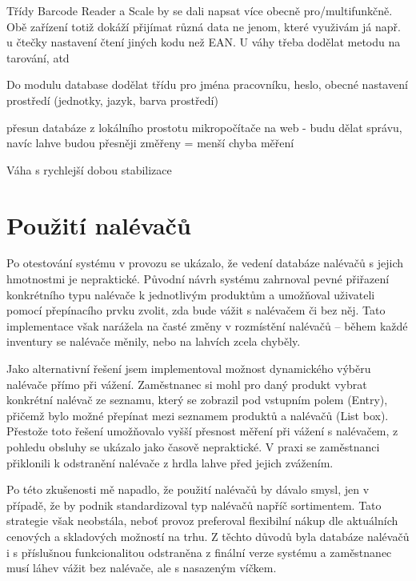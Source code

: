 Třídy Barcode Reader a Scale by se dali napsat více obecně pro/multifunkčně. Obě zařízení totiž dokáží přijímat různá data ne jenom, které využivám já např. u čtečky nastavení čtení jiných kodu než EAN. U váhy třeba dodělat metodu na tarování, atd

Do modulu database dodělat třídu pro jména pracovníku, heslo, obecné nastavení prostředí (jednotky, jazyk, barva prostředí)

přesun databáze z lokálního prostotu mikropočítače na web - budu dělat správu, navíc lahve budou přesněji změřeny = menší chyba měření 

Váha s rychlejší dobou stabilizace

\section{Použití nalévačů}
Po otestování systému v provozu se ukázalo, že vedení databáze nalévačů s jejich hmotnostmi je nepraktické. Původní návrh systému zahrnoval pevné přiřazení konkrétního typu nalévače k jednotlivým produktům a umožňoval uživateli pomocí přepínacího prvku zvolit, zda bude vážit s nalévačem či bez něj. Tato implementace však narážela na časté změny v rozmístění nalévačů – během každé inventury se nalévače měnily, nebo na lahvích zcela chyběly.

Jako alternativní řešení jsem implementoval možnost dynamického výběru nalévače přímo při vážení. Zaměstnanec si mohl pro daný produkt vybrat konkrétní nalévač ze seznamu, který se zobrazil pod vstupním polem (Entry), přičemž bylo možné přepínat mezi seznamem produktů a nalévačů (List box). Přestože toto řešení umožňovalo vyšší přesnost měření při vážení s nalévačem, z pohledu obsluhy se ukázalo jako časově nepraktické. V praxi se zaměstnanci přiklonili k odstranění nalévače z hrdla lahve před jejich zvážením.

Po této zkušenosti mě napadlo, že použití nalévačů by dávalo smysl, jen v případě, že by podnik standardizoval typ nalévačů napříč sortimentem. Tato strategie však neobstála, neboť provoz preferoval flexibilní nákup dle aktuálních cenových a skladových možností na trhu. Z těchto důvodů byla databáze nalévačů i s příslušnou funkcionalitou odstraněna z finální verze systému a zaměstnanec musí láhev vážit bez nalévače, ale s nasazeným víčkem.